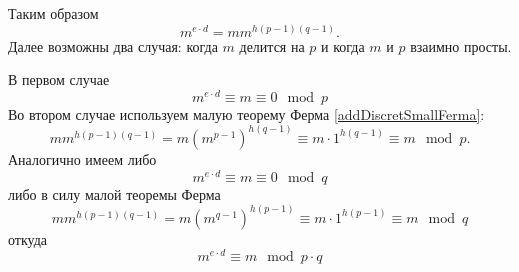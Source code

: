 Таким образом
\[
m^{e\cdot d} =m m^{h \left(p - 1\right)\left(q - 1\right)}.
\]
Далее возможны два случая: когда $m$ делится на $p$ и когда $m$ и $p$
взаимно просты.

В первом случае 
\[
m^{e\cdot d} \equiv m \equiv 0 \mod{p}
\]
Во втором случае используем малую теорему Ферма
\autoref{addDiscretSmallFerma}:
\[
m m^{h \left(p - 1\right)\left(q - 1\right)} 
= m \left(m^{p - 1}\right)^{h \left(q - 1\right)} \equiv m \cdot 1^{h
  \left(q - 1\right)} \equiv m \mod{p}.
\]
Аналогично имеем либо
\[
m^{e\cdot d} \equiv m \equiv 0 \mod{q}
\]
либо в силу малой теоремы Ферма
\[
m m^{h \left(p - 1\right)\left(q - 1\right)} 
= m \left(m^{q - 1}\right)^{h \left(p - 1\right)} \equiv m \cdot 1^{h
  \left(p - 1\right)} \equiv m \mod{q}
\]
откуда
\[
m^{e\cdot d} \equiv m \mod{p \cdot q}
\]
